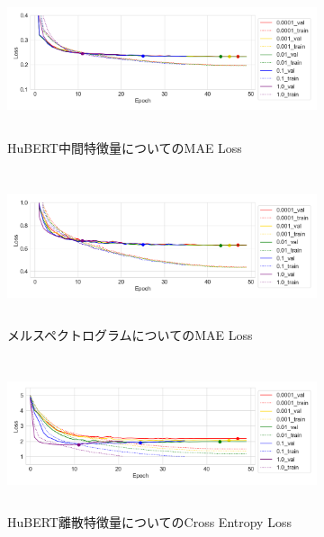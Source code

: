 \begin{figure}[bt]
    \centering
    \begin{subfigure}{\linewidth}
        \centering
        \includegraphics[height=45mm]{./figure/sec4/learning_curves/1/ssl_conv_feature_loss.png}
        \caption{HuBERT中間特徴量についてのMAE Loss}
        \label{sec4:fig:learning_curve_method_1_val_ssl_conv_feature_loss}
    \end{subfigure}
    \begin{subfigure}{\linewidth}
        \centering
        \includegraphics[height=45mm]{./figure/sec4/learning_curves/1/mel_loss.png}
        \caption{メルスペクトログラムについてのMAE Loss}
        \label{sec4:fig:learning_curve_method_1_val_mel_loss}
    \end{subfigure}
    \begin{subfigure}{\linewidth}
        \centering
        \includegraphics[height=45mm]{./figure/sec4/learning_curves/1/ssl_feature_cluster_loss.png}
        \caption{HuBERT離散特徴量についてのCross Entropy Loss}
        \label{sec4:fig:learning_curve_method_1_val_ssl_feature_cluster_loss}
    \end{subfigure}
    \begin{subfigure}{\linewidth}

\end{subfigure}
\end{figure}
